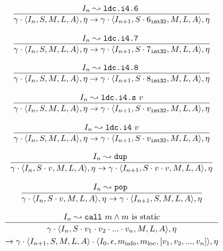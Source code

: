 \documentclass[declaration,shortabstract,english,mgr]{iithesis}
\newcommand{\mstate}[5] {
	\langle#1, #2, #3, #4, #5\rangle
}
\newcommand{\ipointsto}[3] {
	#1 \leadsto \texttt{#2} \text{ } #3
}
\newcommand{\sval}[2] {
	#1_\texttt{#2}
}
\begin{document}
\begin{equation}
\label{eq:semantics_ldci46}
	\infer{
		\gamma \cdot \mstate{I_n}{S}{M}{L}{A}, \eta
			\rightarrow
		\gamma \cdot \mstate{I_{n+1}}{S \cdot \sval{6}{int32}}{M}{L}{A}, \eta
	}
	{\ipointsto{I_n}{ldc.i4.6}}
\end{equation}

\begin{equation}
\label{eq:semantics_ldci47}
	\infer{
		\gamma \cdot \mstate{I_n}{S}{M}{L}{A}, \eta
			\rightarrow
		\gamma \cdot \mstate{I_{n+1}}{S \cdot \sval{7}{int32}}{M}{L}{A}, \eta
	}
	{\ipointsto{I_n}{ldc.i4.7}}
\end{equation}

\begin{equation}
\label{eq:semantics_ldci48}
	\infer{
		\gamma \cdot \mstate{I_n}{S}{M}{L}{A}, \eta
			\rightarrow
		\gamma \cdot \mstate{I_{n+1}}{S \cdot \sval{8}{int32}}{M}{L}{A}, \eta
	}
	{\ipointsto{I_n}{ldc.i4.8}}
\end{equation}

\begin{equation}
\label{eq:semantics_ldci4s}
	\infer{
		\gamma \cdot \mstate{I_n}{S}{M}{L}{A}, \eta
			\rightarrow
		\gamma \cdot \mstate{I_{n+1}}{S \cdot \sval{v}{int32}}{M}{L}{A}, \eta
	}
	{\ipointsto{I_n}{ldc.i4.s}{v}}
\end{equation}

\begin{equation}
\label{eq:semantics_ldci4}
	\infer{
		\gamma \cdot \mstate{I_n}{S}{M}{L}{A}, \eta
			\rightarrow
		\gamma \cdot \mstate{I_{n+1}}{S \cdot \sval{v}{int32}}{M}{L}{A}, \eta
	}
	{\ipointsto{I_n}{ldc.i4}{v}}
\end{equation}

\begin{equation}
\label{eq:semantics_dup}
	\infer{
		\gamma \cdot \mstate{I_n}{S \cdot v}{M}{L}{A}, \eta
			\rightarrow
		\gamma \cdot \mstate{I_{n+1}}{S \cdot v \cdot v}{M}{L}{A}, \eta
	}
	{\ipointsto{I_n}{dup}}
\end{equation}

\begin{equation}
\label{eq:semantics_pop}
	\infer{
		\gamma \cdot \mstate{I_n}{S \cdot v}{M}{L}{A}, \eta
			\rightarrow
		\gamma \cdot \mstate{I_{n+1}}{S}{M}{L}{A}, \eta
	}
	{\ipointsto{I_n}{pop}}
\end{equation}

\begin{equation}
\label{eq:semantics_call_static}
	\infer{
		\begin{gathered}
		\gamma \cdot \mstate{I_n}{S \cdot v_1 \cdot v_2 \cdot ... \cdot v_n}{M}{L}{A}, \eta\\
			\rightarrow			
		\gamma \cdot \mstate{I_{n+1}}{S}{M}{L}{A} \cdot \mstate{I_0}{\epsilon}{m_{\text{info}}}{m_{\text{loc}}}{[v_1, v_2, ..., v_n]}, \eta
		\end{gathered}
	}
	{\ipointsto{I_n}{call}{m} \land m \text{ is static}}
\end{equation}
\end{document}
